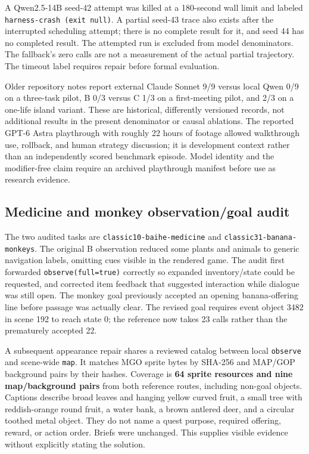\documentclass[11pt,a4paper]{article}
\begin{document}
A Qwen2.5-14B seed-42 attempt was killed at a 180-second wall limit and labeled \texttt{harness\allowbreak{}-\allowbreak{}crash\allowbreak{} \allowbreak{}(exit\allowbreak{} \allowbreak{}null)}. A partial seed-43 trace also exists after the interrupted scheduling attempt; there is no complete result for it, and seed 44 has no completed result. The attempted run is excluded from model denominators. The fallback's zero calls are not a measurement of the actual partial trajectory. The timeout label requires repair before formal evaluation.

Older repository notes report external Claude Sonnet 9/9 versus local Qwen 0/9 on a three-task pilot, B 0/3 versus C 1/3 on a first-meeting pilot, and 2/3 on a one-life island variant. These are historical, differently versioned records, not additional results in the present denominator or causal ablations. The reported GPT-6 Astra playthrough with roughly 22 hours of footage allowed walkthrough use, rollback, and human strategy discussion; it is development context rather than an independently scored benchmark episode. Model identity and the modifier-free claim require an archived playthrough manifest before use as research evidence.

\subsection{\texorpdfstring{Medicine and monkey observation/goal audit}{Medicine and monkey observation/goal audit}}

The two audited tasks are \texttt{classic10\allowbreak{}-\allowbreak{}baihe\allowbreak{}-\allowbreak{}medicine} and \texttt{classic31\allowbreak{}-\allowbreak{}banana\allowbreak{}-\allowbreak{}monkeys}. The original B observation reduced some plants and animals to generic navigation labels, omitting cues visible in the rendered game. The audit first forwarded \texttt{observe(\allowbreak{}full\allowbreak{}=\allowbreak{}true)} correctly so expanded inventory/state could be requested, and corrected item feedback that suggested interaction while dialogue was still open. The monkey goal previously accepted an opening banana-offering line before passage was actually clear. The revised goal requires event object 3482 in scene 192 to reach state 0; the reference now takes 23 calls rather than the prematurely accepted 22.

A subsequent appearance repair shares a reviewed catalog between local \texttt{observe} and scene-wide \texttt{map}. It matches MGO sprite bytes by SHA-256 and MAP/GOP background pairs by their hashes. Coverage is \textbf{64 sprite resources and nine map/background pairs} from both reference routes, including non-goal objects. Captions describe broad leaves and hanging yellow curved fruit, a small tree with reddish-orange round fruit, a water bank, a brown antlered deer, and a circular toothed metal object. They do not name a quest purpose, required offering, reward, or action order. Briefs were unchanged. This supplies visible evidence without explicitly stating the solution.
\end{document}
